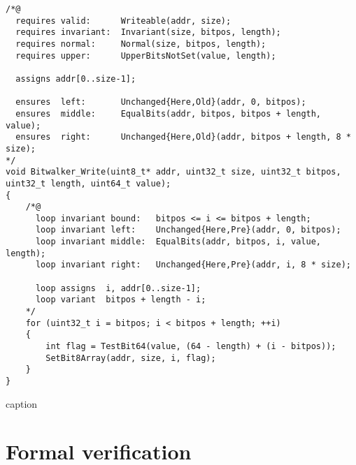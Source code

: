 \begin{listing}[hbt]
\begin{minipage}{0.99\textwidth}
\begin{lstlisting}[style=acsl-block]
/*@
  requires valid:      Writeable(addr, size);
  requires invariant:  Invariant(size, bitpos, length);
  requires normal:     Normal(size, bitpos, length);
  requires upper:      UpperBitsNotSet(value, length);

  assigns addr[0..size-1];

  ensures  left:       Unchanged{Here,Old}(addr, 0, bitpos);
  ensures  middle:     EqualBits(addr, bitpos, bitpos + length, value);
  ensures  right:      Unchanged{Here,Old}(addr, bitpos + length, 8 * size);
*/
void Bitwalker_Write(uint8_t* addr, uint32_t size, uint32_t bitpos, uint32_t length, uint64_t value);
{
    /*@
      loop invariant bound:   bitpos <= i <= bitpos + length;
      loop invariant left:    Unchanged{Here,Pre}(addr, 0, bitpos);
      loop invariant middle:  EqualBits(addr, bitpos, i, value, length);
      loop invariant right:   Unchanged{Here,Pre}(addr, i, 8 * size);

      loop assigns  i, addr[0..size-1];
      loop variant  bitpos + length - i;
    */
    for (uint32_t i = bitpos; i < bitpos + length; ++i)
    {
        int flag = TestBit64(value, (64 - length) + (i - bitpos));
        SetBit8Array(addr, size, i, flag);
    }   
}

\end{lstlisting}
\end{minipage}
\caption{caption}
\end{listing}
















\FloatBarrier

\section{Formal verification}

